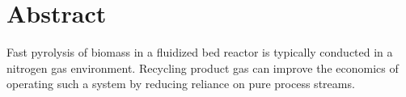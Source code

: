 
\section*{Abstract}

Fast pyrolysis of biomass in a fluidized bed reactor is typically conducted in a nitrogen gas environment. Recycling product gas can improve the economics of operating such a system by reducing reliance on pure process streams.
